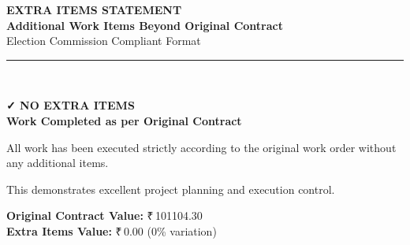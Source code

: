 \documentclass[12pt,a4paper]{article}
\newcommand{\rupees}[1]{₹\,#1}
\begin{document}
\begin{center}
    {\Huge\textbf{\textcolor{headerred}{EXTRA ITEMS STATEMENT}}}\\[0.8cm]
    {\Large\textbf{Additional Work Items Beyond Original Contract}}\\[0.5cm]
    {\large Election Commission Compliant Format}\\[0.3cm]
    \rule{\textwidth}{2pt}\\[1cm]
\end{center}

\begin{center}
\end{center}

\vspace{1cm}


\vspace{2cm}
\begin{center}
\colorbox{approvedgreen!20}{\begin{minipage}{0.7\textwidth}
\begin{center}
{\Large\textcolor{approvedgreen}{\textbf{✓ NO EXTRA ITEMS}}}\\[1cm]
{\large\textbf{Work Completed as per Original Contract}}\\[0.5cm]
\end{center}

All work has been executed strictly according to the original work order without any additional items.

This demonstrates excellent project planning and execution control.

\vspace{0.5cm}
\begin{center}
\textbf{Original Contract Value:} \rupees{101104.30}\\
\textbf{Extra Items Value:} \rupees{0.00} (0\% variation)
\end{center}
\end{minipage}}
\end{center}
\end{document}
